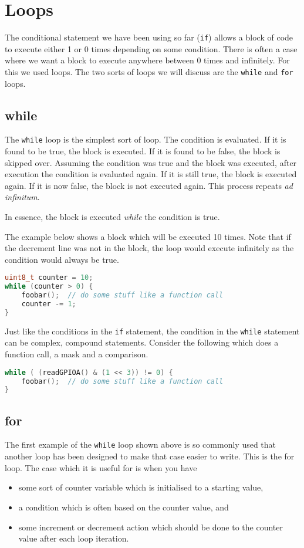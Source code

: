\chapter{Loops}
The conditional statement we have been using so far (\texttt{if}) allows a block of code to execute either 1 or 0 times depending on some condition.
There is often a case where we want a block to execute anywhere between 0 times and infinitely. For this we used loops. 
The two sorts of loops we will discuss are the \texttt{while} and \texttt{for} loops.

\section{while}
The \texttt{while} loop is the simplest sort of loop. 
The condition is evaluated. If it is found to be true, the block is executed. If it is found to be false, the block is skipped over.
Assuming the condition was true and the block was executed, after execution the condition is evaluated again. 
If it is still true, the block is executed again. If it is now false, the block is not executed again. This process repeats \emph{ad infinitum}. 

In essence, the block is executed \emph{while} the condition is true.

The example below shows a block which will be executed 10 times. Note that if the decrement line was not in the block, the loop would execute infinitely as the condition would always be true.

\begin{lstlisting}[language=c]
uint8_t counter = 10;
while (counter > 0) {
    foobar();  // do some stuff like a function call
    counter -= 1; 
}
\end{lstlisting}

Just like the conditions in the \texttt{if} statement, the condition in the \texttt{while} statement can be complex, compound statements. 
Consider the following which does a function call, a mask and a comparison.

\begin{lstlisting}[language=c]
while ( (readGPIOA() & (1 << 3)) != 0) {
    foobar();  // do some stuff like a function call
}
\end{lstlisting}

\section{for}
The first example of the \texttt{while} loop shown above is so commonly used that another loop has been designed to make that case easier to write. 
This is the {for} loop.
The case which it is useful for is when you have 
\begin{itemize}
    \item some sort of counter variable which is initialised to a starting value,
    \item a condition which is often based on the counter value, and
    \item some increment or decrement action which should be done to the counter value after each loop iteration.
\end{itemize}

